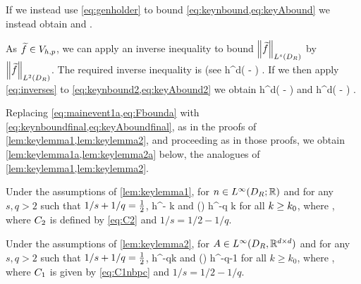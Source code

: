 If we instead use \cref{eq:genholder} to bound \cref{eq:keynbound,eq:keyAbound} we instead obtain
\beq\label{eq:keynbound2}
 \leq {}\NLsDR{\ftilde}
\eeq
and
\beq\label{eq:keyAbound2}
 \leq {}\NLsDR{\ftilde}.
\eeq

As $\widetilde{f} \in V_{h,p}$, we can apply an inverse inequality to bound $\NLsDR{\ftilde}$ by $\NLtDR{\ftilde}$. The required inverse inequality is (see \cite[Theorem 4.5.11 and Remark 4.5.20]{BrSc:08}
\beq\label{eq:inverses}
\NLsDR{\ftilde} \leq \Cinvs h^{d\mleft( - \half\mright)} \NLtDR{\ftilde}.
\eeq
If we then apply \cref{eq:inverses} to \cref{eq:keynbound2,eq:keyAbound2} we obtain
\beq\label{eq:keynboundfinal}
 \leq \Cinvs {} h^{d\mleft( - \half\mright)} \NLtDR{\ftilde}
\eeq
and
\beq\label{eq:keyAboundfinal}
 \leq \Cinvs {} h^{d\mleft( - \half\mright)} \NLtDR{\grad\ftilde}.
\eeq

Replacing \cref{eq:mainevent1a,eq:Fbounda} with \cref{eq:keynboundfinal,eq:keyAboundfinal}, as in the proofs of \cref{lem:keylemma1,lem:keylemma2}, and proceeding as in those proofs, we obtain \cref{lem:keylemma1a,lem:keylemma2a} below, the analogues of \cref{lem:keylemma1,lem:keylemma2}.

\label{lem:keylemma1a}
Under the assumptions of \cref{lem:keylemma1}, for $n\in \LiDRRR$ and for any $s,q > 2$ such that $1/s + 1/q = \frac{1}{2}$,
\beq\label{eq:keybound12}
\max\set{\NDk{\AmatoI \Mmatn},\NDkI{\Mmatn\AmatoI}} \leq \Cttilde h^{-} k
\eeq
and 
\beq\label{eq:keybound1a2}
\max\set{\Nt{\AmatoI \Mmatn},\Nt{\Mmatn\AmatoI}} \leq \Cttilde\mleft(\frac{\mplus}{\mminus}\mright) h^{-q} k
\eeq
for all $k\geq k_{0}$,
where
\beq\label{eq:C2tilde}
\Cttilde\de%
\Cinvs\Ct,
\eeq
where $C_{2}$ is defined by \cref{eq:C2} and $1/s = 1/2 - 1/q.$
\ele

\label{lem:keylemma2a}
Under the assumptions of \cref{lem:keylemma2}, for $A\in L^\infty(D_{R},\mathbb R^{d\times d})$ and for any $s,q > 2$ such that $1/s + 1/q = \frac{1}{2}$,
\beq\label{eq:keybound22}
\max\set{\NDk{\AmatoI \SmatA},\NDkI{\SmatA\AmatoI}} \leq \Cotilde h^{-q}k 
\eeq
and
\beq\label{eq:keybound2a2}
\max\set{\Nt{\AmatoI \SmatA},\Nt{\SmatA\AmatoI}} \leq \Cotilde\mleft(\frac{\splus}{\mminus}\mright) h^{-q-1} 
\eeq
for all $k\geq k_0$, where
\beq\label{eq:C1tildenbpc}
\Cotilde \de \Cinvs\Co,
\eeq
where $C_{1}$ is given by \cref{eq:C1nbpc} and $1/s = 1/2 - 1/q.$
\ele

